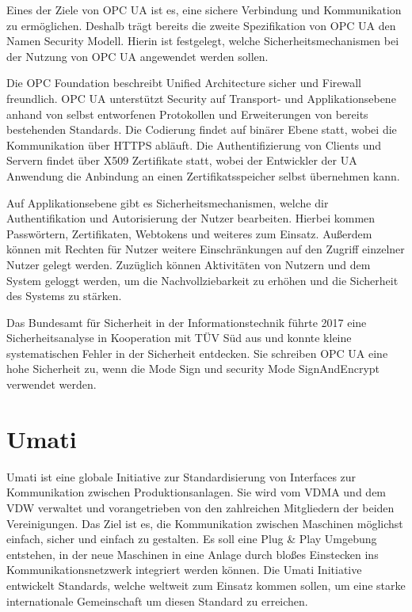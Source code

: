 \documentclass[a4paper, 12pt, oneside]{scrbook}
\begin{document}
		
		Eines der Ziele von OPC UA ist es, eine sichere Verbindung und Kommunikation zu ermöglichen. Deshalb trägt bereits die zweite Spezifikation von OPC UA den Namen 
		\glqq Security Modell\grqq. Hierin ist festgelegt, welche Sicherheitsmechanismen bei der Nutzung von OPC UA angewendet werden sollen.
		
		Die OPC Foundation beschreibt Unified Architecture sicher und Firewall freundlich. OPC UA unterstützt Security auf Transport- und Applikationsebene anhand von selbst entworfenen Protokollen und Erweiterungen von bereits bestehenden Standards. Die Codierung findet auf binärer Ebene statt, wobei die Kommunikation über HTTPS abläuft. Die Authentifizierung von Clients und Servern findet über X509 Zertifikate statt, wobei der Entwickler der UA Anwendung die Anbindung an einen Zertifikatsspeicher selbst übernehmen kann. \cite{noauthor_unified_nodate, noauthor_opc_nodate}
		
		Auf Applikationsebene gibt es Sicherheitsmechanismen, welche dir Authentifikation und Autorisierung der Nutzer bearbeiten. Hierbei kommen Passwörtern, Zertifikaten, Webtokens und weiteres zum Einsatz. Außerdem können mit Rechten für Nutzer weitere Einschränkungen auf den Zugriff einzelner Nutzer gelegt werden. Zuzüglich können Aktivitäten von Nutzern und dem System geloggt werden, um die Nachvollziebarkeit zu erhöhen und die Sicherheit des Systems zu stärken. \cite{noauthor_unified_nodate, noauthor_opc_nodate}
		
		Das Bundesamt für Sicherheit in der Informationstechnik führte 2017 eine Sicherheitsanalyse in Kooperation mit TÜV Süd aus und konnte kleine systematischen Fehler in der Sicherheit entdecken. Sie schreiben OPC UA eine hohe Sicherheit zu, wenn die  Mode Sign und security Mode SignAndEncrypt verwendet werden. \cite{damm_opc_2017}
		
		
	
	\section{Umati}
		
		
		Umati ist eine globale Initiative zur Standardisierung von Interfaces zur Kommunikation zwischen Produktionsanlagen. Sie wird vom \ac{VDMA} und dem \ac{VDW} verwaltet und vorangetrieben von den zahlreichen Mitgliedern der beiden Vereinigungen. Das Ziel ist es, die Kommunikation zwischen Maschinen möglichst einfach, sicher und einfach zu gestalten. Es soll eine Plug \& Play Umgebung entstehen, in der neue Maschinen in eine Anlage durch bloßes Einstecken ins Kommunikationsnetzwerk integriert werden können. Die Umati Initiative entwickelt Standards, welche weltweit zum Einsatz kommen sollen, um eine starke internationale Gemeinschaft um diesen Standard zu erreichen. \cite{noauthor_umati_2023}
		
\end{document}
